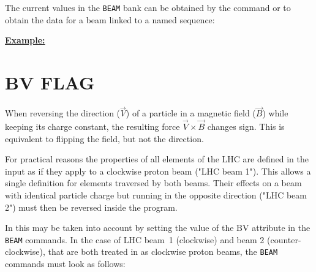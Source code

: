 The current values in the \texttt{BEAM} bank can be obtained by the command
or to obtain the data for a beam linked to a named sequence:


\textbf{\underline{Example:}} 





\section{BV FLAG}
\label{sec:bvflag}
When reversing the direction ($\vec V$) of a particle in a magnetic field
($\vec B$) while keeping its charge constant, the resulting force $\vec
V \times \vec B$ changes sign. This is equivalent to flipping the field,
but not the direction.  

For practical reasons the properties of all elements of the LHC are
defined in the \madx input as if they apply to a clockwise proton beam
("LHC beam 1"). This allows a single definition for elements traversed
by both beams. Their effects on a beam with identical particle charge
but running in the opposite direction ("LHC beam 2") must then be
reversed inside the program.  

In \madx this may be taken into account by setting the value of
the BV attribute in the \texttt{BEAM} commands. In the case of LHC
beam~1 (clockwise) and beam 2 (counter-clockwise), that are both treated
in \madx as clockwise proton beams, the \texttt{BEAM} commands must look
as follows:   






